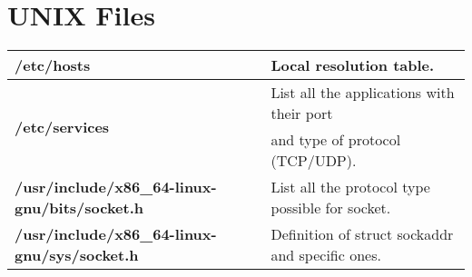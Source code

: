 \section{UNIX Files}\label{files}
\begin{table}[h]
\centering
\footnotesize
\begin{tabular}{|l|l|}
\hline
\textbf{/etc/hosts} & {Local resolution table.}\\
\hline
\multirow{2}{*}{\textbf{/etc/services}} & {List all the applications with their port}\\
& {and type of protocol (TCP/UDP).}\\
\hline
{\textbf{/usr/include/x86\_64-linux-gnu/bits/socket.h}} & {List all the protocol type possible for socket.}\\
\hline
{\textbf{/usr/include/x86\_64-linux-gnu/sys/socket.h}} & {Definition of struct sockaddr and specific ones.}\\
\hline
\end{tabular}
\end{table}

